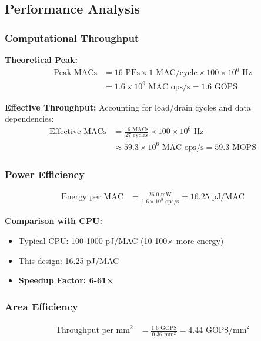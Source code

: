 \documentclass[12pt,a4paper]{article}
\begin{document}
\newpage

\subsection{Performance Analysis}

\subsubsection{Computational Throughput}

\textbf{Theoretical Peak:}
\begin{align}
    \text{Peak MACs} &= 16 \text{ PEs} \times 1 \text{ MAC/cycle} \times 100 \times 10^6 \text{ Hz} \nonumber \\
    &= 1.6 \times 10^9 \text{ MAC ops/s} = 1.6 \text{ GOPS}
\end{align}

\textbf{Effective Throughput:}
Accounting for load/drain cycles and data dependencies:
\begin{align}
    \text{Effective MACs} &= \frac{16 \text{ MACs}}{27 \text{ cycles}} \times 100 \times 10^6 \text{ Hz} \nonumber \\
    &\approx 59.3 \times 10^6 \text{ MAC ops/s} = 59.3 \text{ MOPS}
\end{align}

\subsubsection{Power Efficiency}

\begin{align}
    \text{Energy per MAC} &= \frac{26.0 \text{ mW}}{1.6 \times 10^9 \text{ ops/s}} = 16.25 \text{ pJ/MAC}
\end{align}

\textbf{Comparison with CPU:}
\begin{itemize}
    \item Typical CPU: 100-1000 pJ/MAC (10-100× more energy)
    \item This design: 16.25 pJ/MAC
    \item \textbf{Speedup Factor: 6-61×}
\end{itemize}

\subsubsection{Area Efficiency}

\begin{align}
    \text{Throughput per mm}^2 &= \frac{1.6 \text{ GOPS}}{0.36 \text{ mm}^2} = 4.44 \text{ GOPS/mm}^2
\end{align}
\end{document}
